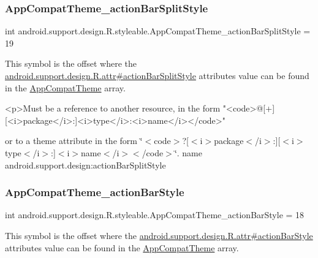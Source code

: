 \subsubsection{\texorpdfstring{App\+Compat\+Theme\+\_\+action\+Bar\+Split\+Style}{AppCompatTheme\_actionBarSplitStyle}}
{\footnotesize\ttfamily int android.\+support.\+design.\+R.\+styleable.\+App\+Compat\+Theme\+\_\+action\+Bar\+Split\+Style = 19\hspace{0.3cm}{\ttfamily [static]}}

This symbol is the offset where the \hyperlink{classandroid_1_1support_1_1design_1_1R_1_1attr_ad4f51b6783eb5ada7fcecc7351c71b30}{android.\+support.\+design.\+R.\+attr\#action\+Bar\+Split\+Style} attribute\textquotesingle{}s value can be found in the \hyperlink{classandroid_1_1support_1_1design_1_1R_1_1styleable_afb351dc8de20cbd4c89abe360373010c}{App\+Compat\+Theme} array.

\begin{DoxyVerb}      <p>Must be a reference to another resource, in the form "<code>@[+][<i>package</i>:]<i>type</i>:<i>name</i></code>"
\end{DoxyVerb}
 or to a theme attribute in the form \char`\"{}$<$code$>$?\mbox{[}$<$i$>$package$<$/i$>$\+:\mbox{]}\mbox{[}$<$i$>$type$<$/i$>$\+:\mbox{]}$<$i$>$name$<$/i$>$$<$/code$>$\char`\"{}.  name android.\+support.\+design\+:action\+Bar\+Split\+Style \mbox{\label{classandroid_1_1support_1_1design_1_1R_1_1styleable_a762be5b610718b70a3cf442d4599d870}} 
\subsubsection{\texorpdfstring{App\+Compat\+Theme\+\_\+action\+Bar\+Style}{AppCompatTheme\_actionBarStyle}}
{\footnotesize\ttfamily int android.\+support.\+design.\+R.\+styleable.\+App\+Compat\+Theme\+\_\+action\+Bar\+Style = 18\hspace{0.3cm}{\ttfamily [static]}}

This symbol is the offset where the \hyperlink{classandroid_1_1support_1_1design_1_1R_1_1attr_aa690dad5a754dbbe42fc87c513350c33}{android.\+support.\+design.\+R.\+attr\#action\+Bar\+Style} attribute\textquotesingle{}s value can be found in the \hyperlink{classandroid_1_1support_1_1design_1_1R_1_1styleable_afb351dc8de20cbd4c89abe360373010c}{App\+Compat\+Theme} array.

